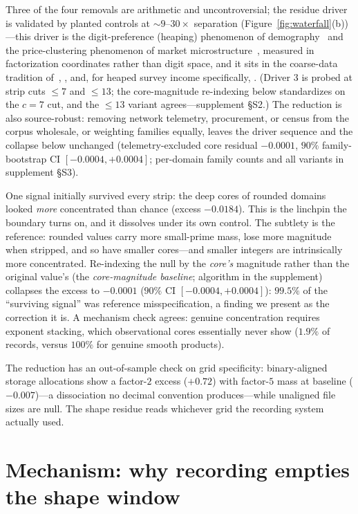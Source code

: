 \documentclass[12pt]{article}
\begin{document}
Three of the four removals are arithmetic and uncontroversial; the residue
driver is validated by planted controls at ${\sim}9$--$30\times$ separation
(Figure~\ref{fig:waterfall}(b))---this driver is the digit-preference
(heaping) phenomenon of demography~\citep{myers1940,ahearn2009} and the
price-clustering phenomenon of market microstructure~\citep{harris1991},
measured in factorization coordinates rather than digit space, and it sits in
the coarse-data tradition of~\citet{heitjanrubin1991},
\citet{manskimolinari2010}, and, for heaped survey income specifically,
\citet{drechslerkiesl2016}. (Driver 3 is probed at strip cuts $\le 7$ and
$\le 13$; the core-magnitude re-indexing below standardizes on the $c = 7$
cut, and the $\le 13$ variant agrees---supplement \S S2.) The reduction is
also source-robust: removing network telemetry, procurement, or census from
the corpus wholesale, or weighting families equally, leaves the driver
sequence and the collapse below unchanged (telemetry-excluded core residual
$-0.0001$, $90\%$ family-bootstrap CI $[-0.0004, +0.0004]$; per-domain
family counts and all variants in supplement \S S3).

One signal initially survived every strip: the deep cores of rounded domains
looked \emph{more} concentrated than chance (excess $-0.0184$). This is the
linchpin the boundary turns on, and it dissolves under its own control. The
subtlety is the reference: rounded values carry more small-prime mass, lose
more magnitude when stripped, and so have smaller cores---and smaller integers
are intrinsically more concentrated. Re-indexing the null by the \emph{core's}
magnitude rather than the original value's (the \emph{core-magnitude
baseline}; algorithm in the supplement) collapses the excess to $-0.0001$
($90\%$ CI $[-0.0004, +0.0004]$): $99.5\%$ of the ``surviving signal'' was
reference misspecification, a finding we present as the correction it is. A
mechanism check agrees: genuine concentration requires exponent stacking,
which observational cores essentially never show ($1.9\%$ of records, versus
$100\%$ for genuine smooth products).

The reduction has an out-of-sample check on grid specificity: binary-aligned
storage allocations show a factor-$2$ excess ($+0.72$) with factor-$5$ mass at
baseline ($-0.007$)---a dissociation no decimal convention produces---while
unaligned file sizes are null. The shape residue reads whichever grid the
recording system actually used.

\section{Mechanism: why recording empties the shape window}
\label{sec:mechanism}
\end{document}
